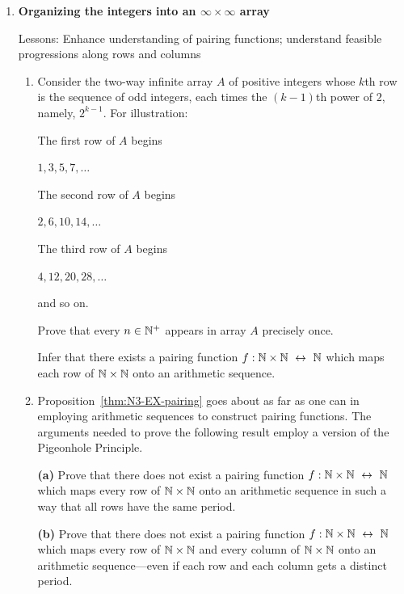 \begin{enumerate}
\item
{\bf Organizing the integers into an $\infty \times \infty$ array}

{\sc Lessons:} Enhance understanding of pairing functions; understand feasible progressions along rows and columns

\smallskip

  \begin{enumerate}
  \item
Consider the two-way infinite array $A$ of positive integers whose $k$th row is the sequence of odd integers, each times the $(k-1)$th power of $2$, namely, $2^{k-1}$.  For illustration:

The first row of $A$ begins

\hspace*{.2in}$1, 3, 5, 7, \ldots$

The second row of $A$ begins

\hspace*{.2in}$2, 6, 10, 14, \ldots$

The third row of $A$ begins

\hspace*{.2in}$4, 12, 20, 28, \ldots$

and so on.

\begin{prop}
\label{thm:N3-EX-pairing}
Prove that every $n \in \mathbb{N}^+$ appears in array $A$ precisely once.

\smallskip

Infer that there exists a pairing function $f: \N \times \N \ \leftrightarrow \ \N$ which maps each row of $\mathbb{N} \times \mathbb{N}$ onto an arithmetic sequence.
\end{prop}

  \medskip\item
Proposition~\ref{thm:N3-EX-pairing} goes about as far as one can in employing arithmetic sequences to construct pairing functions.  The arguments needed to prove the following result employ a version of the Pigeonhole Principle.

\begin{prop}
{\bf (a)}
Prove that there does not exist a pairing function $f: \N \times \N \ \leftrightarrow \ \N$ which maps every row of $\mathbb{N} \times \mathbb{N}$ onto an arithmetic sequence in such a way that all rows have the same period.

\smallskip

{\bf (b)}
Prove that there does not exist a pairing function $f: \N \times \N \ \leftrightarrow \ \N$ which maps every row of $\mathbb{N} \times \mathbb{N}$ and every column of $\mathbb{N} \times \mathbb{N}$ onto an arithmetic sequence---even if each row and each column gets a distinct period.
\end{prop}
  \end{enumerate}


\end{enumerate}
